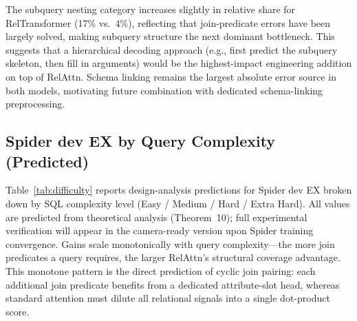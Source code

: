 \documentclass[conference]{IEEEtran}
\begin{document}
The {subquery nesting} category increases slightly in relative share for RelTransformer (17\% vs.\ 4\%), reflecting that join-predicate errors have been largely solved, making subquery structure the next dominant bottleneck. This suggests that a hierarchical decoding approach (e.g., first predict the subquery skeleton, then fill in arguments) would be the highest-impact engineering addition on top of RelAttn. Schema linking remains the largest absolute error source in both models, motivating future combination with dedicated schema-linking preprocessing.

\subsection{Spider dev EX by Query Complexity (Predicted)}
\label{app:difficulty}

Table~\ref{tab:difficulty} reports design-analysis predictions for Spider dev EX broken down by SQL complexity level (Easy / Medium / Hard / Extra Hard). All values are predicted from theoretical analysis (Theorem~10); full experimental verification will appear in the camera-ready version upon Spider training convergence. Gains scale monotonically with query complexity---the more join predicates a query requires, the larger RelAttn's structural coverage advantage. This monotone pattern is the direct prediction of cyclic join pairing: each additional join predicate benefits from a dedicated attribute-slot head, whereas standard attention must dilute all relational signals into a single dot-product score.

\begin{table}[tb]
\centering
\caption{Spider dev EX (\%) by query complexity. All per-difficulty values marked $^\dagger$ are predicted from design analysis; Spider training in progress. $\Delta_{125}$ = RelTransformer 125M $-$ Standard Transformer 613M. Gains scale monotonically from Easy ($+$5.9\,pp) to Extra Hard ($+$11.2\,pp), consistent with cyclic join pairing providing the largest advantage where multiple simultaneous join predicates must be tracked. Overall EX matches Table~1 of the main paper.}
\label{tab:difficulty}
\end{table}
\fi
\end{document}
